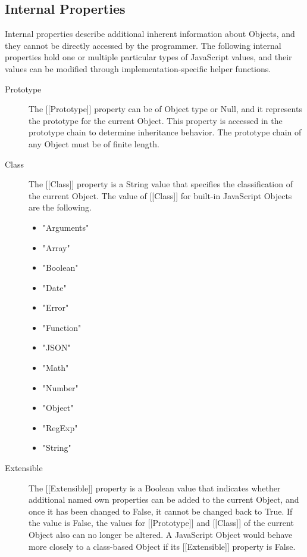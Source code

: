 \documentclass[a4paper,11pt,twoside]{report}
\begin{document}
\subsection{Internal Properties}
Internal properties describe additional inherent information about Objects, and they cannot be directly accessed by the programmer. The following internal properties hold one or multiple particular types of JavaScript values, and their values can be modified through implementation-specific helper functions.

\begin{description}
\item[Prototype] The [[Prototype]] property can be of Object type or Null, and it represents the prototype for the current Object. This property is accessed in the prototype chain to determine inheritance behavior. The prototype chain of any Object must be of finite length. 

\item[Class] The [[Class]] property is a String value that specifies the classification of the current Object. The value of [[Class]] for built-in JavaScript Objects are the following.
\begin{multicols}{3}
\begin{itemize}
	\item "Arguments"
	\item "Array"
	\item "Boolean"
	\item "Date"
	\item "Error"
	\item "Function"
	\item "JSON"
	\item "Math"
	\item "Number"
	\item "Object"
	\item "RegExp"
	\item "String"
\end{itemize}
\end{multicols}

\item[Extensible] The [[Extensible]] property is a Boolean value that indicates whether additional named own properties can be added to the current Object, and once it has been changed to False, it cannot be changed back to True. If the value is False, the values for [[Prototype]] and [[Class]] of the current Object also can no longer be altered. A JavaScript Object would behave more closely to a class-based Object if its [[Extensible]] property is False.
\end{description}
\end{document}
